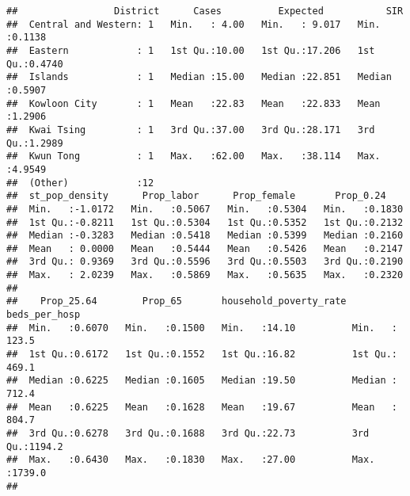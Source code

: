 \documentclass[]{article}
\begin{document}
\begin{verbatim}
##                 District      Cases          Expected           SIR        
##  Central and Western: 1   Min.   : 4.00   Min.   : 9.017   Min.   :0.1138  
##  Eastern            : 1   1st Qu.:10.00   1st Qu.:17.206   1st Qu.:0.4740  
##  Islands            : 1   Median :15.00   Median :22.851   Median :0.5907  
##  Kowloon City       : 1   Mean   :22.83   Mean   :22.833   Mean   :1.2906  
##  Kwai Tsing         : 1   3rd Qu.:37.00   3rd Qu.:28.171   3rd Qu.:1.2989  
##  Kwun Tong          : 1   Max.   :62.00   Max.   :38.114   Max.   :4.9549  
##  (Other)            :12                                                    
##  st_pop_density      Prop_labor      Prop_female       Prop_0.24     
##  Min.   :-1.0172   Min.   :0.5067   Min.   :0.5304   Min.   :0.1830  
##  1st Qu.:-0.8211   1st Qu.:0.5304   1st Qu.:0.5352   1st Qu.:0.2132  
##  Median :-0.3283   Median :0.5418   Median :0.5399   Median :0.2160  
##  Mean   : 0.0000   Mean   :0.5444   Mean   :0.5426   Mean   :0.2147  
##  3rd Qu.: 0.9369   3rd Qu.:0.5596   3rd Qu.:0.5503   3rd Qu.:0.2190  
##  Max.   : 2.0239   Max.   :0.5869   Max.   :0.5635   Max.   :0.2320  
##                                                                      
##    Prop_25.64        Prop_65       household_poverty_rate beds_per_hosp   
##  Min.   :0.6070   Min.   :0.1500   Min.   :14.10          Min.   : 123.5  
##  1st Qu.:0.6172   1st Qu.:0.1552   1st Qu.:16.82          1st Qu.: 469.1  
##  Median :0.6225   Median :0.1605   Median :19.50          Median : 712.4  
##  Mean   :0.6225   Mean   :0.1628   Mean   :19.67          Mean   : 804.7  
##  3rd Qu.:0.6278   3rd Qu.:0.1688   3rd Qu.:22.73          3rd Qu.:1194.2  
##  Max.   :0.6430   Max.   :0.1830   Max.   :27.00          Max.   :1739.0  
## 
\end{verbatim}
\end{document}
